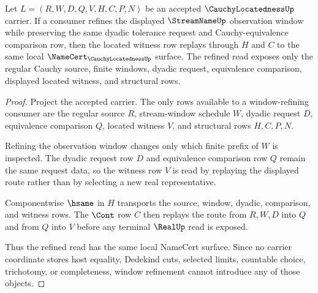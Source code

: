 \begin{theorem}
\label{thm:cauchy-locatedness-window-stability}
Let $L=(R,W,D,Q,V,H,C,P,N)$ be an accepted $\CauchyLocatednessUp$ carrier. If a consumer refines the displayed $\StreamNameUp$ observation window while preserving the same dyadic tolerance request and Cauchy-equivalence comparison row, then the located witness row replays through $H$ and $C$ to the same local $\NameCert_{\CauchyLocatednessUp}$ surface. The refined read exposes only the regular Cauchy source, finite windows, dyadic request, equivalence comparison, displayed located witness, and structural rows.
\end{theorem}
\begin{proof}
Project the accepted carrier. The only rows available to a window-refining consumer are the regular source $R$, stream-window schedule $W$, dyadic request $D$, equivalence comparison $Q$, located witness $V$, and structural rows $H,C,P,N$.

Refining the observation window changes only which finite prefix of $W$ is inspected. The dyadic request row $D$ and equivalence comparison row $Q$ remain the same request data, so the witness row $V$ is read by replaying the displayed route rather than by selecting a new real representative.

Componentwise $\hsame$ in $H$ transports the source, window, dyadic, comparison, and witness rows. The $\Cont$ row $C$ then replays the route from $R,W,D$ into $Q$ and from $Q$ into $V$ before any terminal $\RealUp$ read is exposed.

Thus the refined read has the same local NameCert surface. Since no carrier coordinate stores host equality, Dedekind cuts, selected limits, countable choice, trichotomy, or completeness, window refinement cannot introduce any of those objects.
\end{proof}

